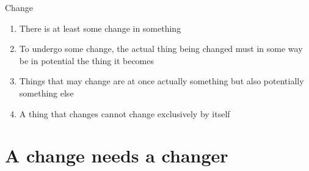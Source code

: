 \documentclass[xcolor=dvipsnames]{beamer}
\begin{document}
\begin{frame}[fragile]{Change}
  \begin{enumerate}
  \item There is at least some change in something \vspace{5mm}
  \item To undergo some change, the actual thing being changed must in some way be in potential the thing it becomes \vspace{5mm}
  \item Things that may change are at once actually something but also potentially something else \vspace{5mm}
  \item A thing that changes cannot change exclusively by itself \vspace{5mm}
  \end{enumerate}
\end{frame}


\section{A change needs a changer}
\end{document}
